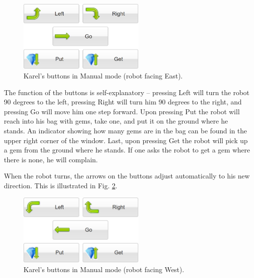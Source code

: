 \begin{figure}[!ht]
\begin{center}
\includegraphics[width=6.2cm]{img/buttons-all.png}
\vspace{-0mm}
\caption{Karel's buttons in Manual mode (robot facing East).}
\label{fig:buttons}
\end{center}
\end{figure}
\noindent
The function of the buttons is self-explanatory -- pressing Left will turn the robot 90 degrees to the left,
pressing Right will turn him 90 degrees to the right, and pressing Go will move him one step forward. 
Upon pressing Put the robot will reach into his bag with gems, 
take one, and put it on the ground where he stands. 
An indicator showing how many gems are in the bag can be found in the upper right 
corner of the window. Last, upon pressing 
Get the robot will pick up a gem from the ground where he stands. If 
one asks the robot to get a gem where there is none, he will complain.

When the robot turns, the arrows on the buttons adjust automatically to his new 
direction. This is illustrated in Fig. \ref{fig:buttons2}.

\begin{figure}[!ht]
\begin{center}
\includegraphics[width=6.2cm]{img/buttons-all-2.png}
\vspace{-0mm}
\caption{Karel's buttons in Manual mode (robot facing West).}
\label{fig:buttons2}
\end{center}
\end{figure}


